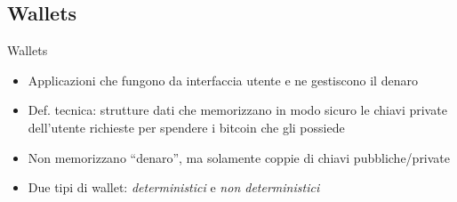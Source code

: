 \documentclass{beamer}
\begin{document}
  \subsection{Wallets}
  \begin{frame}{Wallets}
    \begin{itemize}
      \item Applicazioni che fungono da interfaccia utente e ne gestiscono il denaro 
      \item Def. tecnica: strutture dati che memorizzano in modo sicuro le chiavi private dell'utente richieste per spendere i bitcoin che gli possiede 
      \item Non memorizzano ``denaro'', ma solamente coppie di chiavi pubbliche/private
      \item Due tipi di wallet: \emph{deterministici} e \emph{non deterministici}
    \end{itemize}
  \end{frame}




\end{document}
